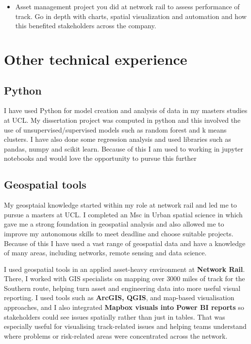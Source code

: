 \documentclass[
  letterpaper,
]{scrbook}
\providecommand{\tightlist}{%
  \setlength{\itemsep}{0pt}\setlength{\parskip}{0pt}}\usepackage{longtable,booktabs,array}
\begin{document}
\begin{itemize}
\tightlist
\item
  Asset management project you did at network rail to assess performance
  of track. Go in depth with charts, spatial visualization and
  automation and how this benefited stakeholders across the company.
\end{itemize}

\section{Other technical experience}\label{other-technical-experience}

\subsection{Python}\label{python}

I have used Python for model creation and analysis of data in my masters
studies at UCL. My dissertation project was computed in python and this
involved the use of unsupervised/supervised models such as random forest
and k means clusters. I have also done some regression analysis and used
libraries such as pandas, numpy and scikit learn. Because of this I am
used to working in jupyter notebooks and would love the opportunity to
pursue this further

\subsection{Geospatial tools}\label{geospatial-tools}

My geosptaial knowledge started within my role at network rail and led
me to pursue a masters at UCL. I completed an Msc in Urban spatial
science in which gave me a strong foundation in geospatial analysis and
also allowed me to improve my autonomous skills to meet deadline and
choose suitable projects. Because of this I have used a vast range of
geospatial data and have a knowledge of many areas, including networks,
remote sensing and data science.

I used geospatial tools in an applied asset-heavy environment at
\textbf{Network Rail}. There, I worked with GIS specialists on mapping
over 3000 miles of track for the Southern route, helping turn asset and
engineering data into more useful visual reporting. I used tools such as
\textbf{ArcGIS, QGIS}, and map-based visualisation approaches, and I
also integrated \textbf{Mapbox visuals into Power BI reports} so
stakeholders could see issues spatially rather than just in tables. That
was especially useful for visualising track-related issues and helping
teams understand where problems or risk-related areas were concentrated
across the network.
\end{document}
